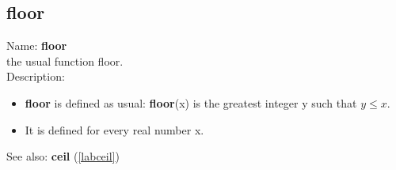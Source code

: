 \subsection{floor}
\label{labfloor}
\noindent Name: \textbf{floor}\\
the usual function floor.\\
\noindent Description: \begin{itemize}

\item \textbf{floor} is defined as usual: \textbf{floor}(x) is the greatest integer y such that $y \le x$.

\item It is defined for every real number x.
\end{itemize}
See also: \textbf{ceil} (\ref{labceil})
